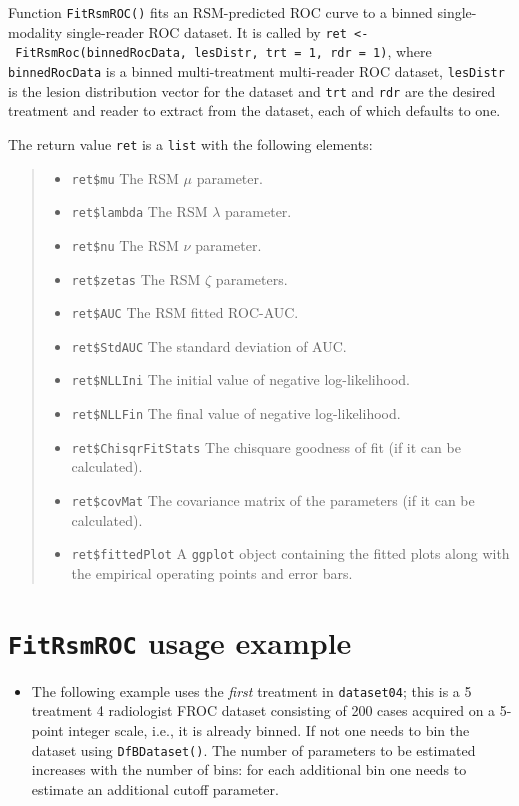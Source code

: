 \documentclass[
]{book}
\providecommand{\tightlist}{%
  \setlength{\itemsep}{0pt}\setlength{\parskip}{0pt}}
\begin{document}
Function \texttt{FitRsmROC()} fits an RSM-predicted ROC curve to a binned single-modality single-reader ROC dataset. It is called by \texttt{ret\ \textless{}-\ FitRsmRoc(binnedRocData,\ lesDistr,\ trt\ =\ 1,\ rdr\ =\ 1)}, where \texttt{binnedRocData} is a binned multi-treatment multi-reader ROC dataset, \texttt{lesDistr} is the lesion distribution vector for the dataset and \texttt{trt} and \texttt{rdr} are the desired treatment and reader to extract from the dataset, each of which defaults to one.

The return value \texttt{ret} is a \texttt{list} with the following elements:

\begin{quote}
\begin{itemize}
\tightlist
\item
  \texttt{ret\$mu} The RSM \(\mu\) parameter.
\item
  \texttt{ret\$lambda} The RSM \(\lambda\) parameter.
\item
  \texttt{ret\$nu} The RSM \(\nu\) parameter.
\item
  \texttt{ret\$zetas} The RSM \(\zeta\) parameters.
\item
  \texttt{ret\$AUC} The RSM fitted ROC-AUC.
\item
  \texttt{ret\$StdAUC} The standard deviation of AUC.
\item
  \texttt{ret\$NLLIni} The initial value of negative log-likelihood.
\item
  \texttt{ret\$NLLFin} The final value of negative log-likelihood.
\item
  \texttt{ret\$ChisqrFitStats} The chisquare goodness of fit (if it can be calculated).
\item
  \texttt{ret\$covMat} The covariance matrix of the parameters (if it can be calculated).
\item
  \texttt{ret\$fittedPlot} A \texttt{ggplot} object containing the fitted plots along with the empirical operating points and error bars.
\end{itemize}
\end{quote}

\hypertarget{rsm-fitting-fitrsmroc-usage-example}{%
\section{\texorpdfstring{\texttt{FitRsmROC} usage example}{FitRsmROC usage example}}\label{rsm-fitting-fitrsmroc-usage-example}}

\begin{itemize}
\tightlist
\item
  The following example uses the \emph{first} treatment in \texttt{dataset04}; this is a 5 treatment 4 radiologist FROC dataset \citep{zanca2009evaluation} consisting of 200 cases acquired on a 5-point integer scale, i.e., it is already binned. If not one needs to bin the dataset using \texttt{DfBDataset()}. The number of parameters to be estimated increases with the number of bins: for each additional bin one needs to estimate an additional cutoff parameter.
\end{itemize}
\end{document}
